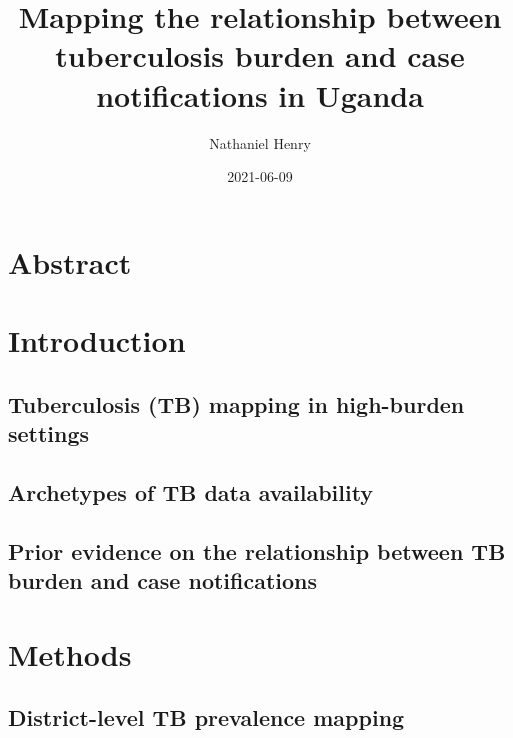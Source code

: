 \documentclass[
]{article}
\title{Mapping the relationship between tuberculosis burden and case notifications in Uganda}
\author{Nathaniel Henry}
\date{2021-06-09}
\begin{document}
\maketitle

\hypertarget{abstract}{%
\section{Abstract}\label{abstract}}

\lipsum[1]

\hypertarget{introduction}{%
\section{Introduction}\label{introduction}}

\lipsum[1-3]

\hypertarget{tuberculosis-tb-mapping-in-high-burden-settings}{%
\subsection{Tuberculosis (TB) mapping in high-burden settings}\label{tuberculosis-tb-mapping-in-high-burden-settings}}

\lipsum[4-5]

\hypertarget{archetypes-of-tb-data-availability}{%
\subsection{Archetypes of TB data availability}\label{archetypes-of-tb-data-availability}}

\lipsum[6-10]

\hypertarget{prior-evidence-on-the-relationship-between-tb-burden-and-case-notifications}{%
\subsection{Prior evidence on the relationship between TB burden and case notifications}\label{prior-evidence-on-the-relationship-between-tb-burden-and-case-notifications}}

\lipsum[11-14]

\hypertarget{methods}{%
\section{Methods}\label{methods}}

\lipsum[1-2]

\hypertarget{district-level-tb-prevalence-mapping}{%
\subsection{District-level TB prevalence mapping}\label{district-level-tb-prevalence-mapping}}
\end{document}
